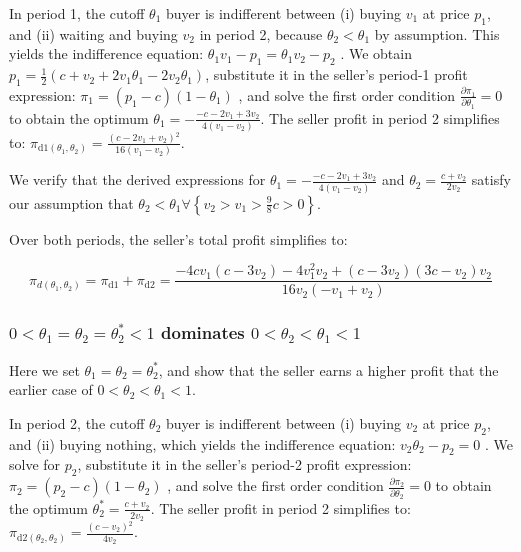 \documentclass{article}
\begin{document}
In period 1, the cutoff \(\theta _1\) buyer is indifferent between (i) buying \(v_1\) at price \(p_1\), and (ii) waiting and buying \(v_2\) in period
2, because \(\theta _2<\theta _1\) by assumption. This { }yields the indifference equation: \(\theta _1v_1 - p_1 = \theta _1 v_2 - p_2\) . We obtain
\(p_1=\frac{1}{2} \left(c+v_2+2 v_1 \theta _1-2 v_2 \theta _1\right)\), substitute it in the seller{'}s period-1 profit expression: \(\pi _1=\left(p_1-c\right)\left(1-\theta
_1\right)\) , and solve the first order condition \(\frac{\partial \pi _1}{\partial \theta _1}=0\) to obtain the optimum \(\theta _1=-\frac{-c-2
v_1+3 v_2}{4 \left(v_1-v_2\right)}\). The seller profit in period 2 simplifies to: \(\pi _{\text{d1}\left(\theta _1,\theta _2\right)}=\frac{\left(c-2
v_1+v_2\right){}^2}{16 \left(v_1-v_2\right)}\).

We verify that the derived expressions for \(\theta _1=-\frac{-c-2 v_1+3 v_2}{4 \left(v_1-v_2\right)}\) and \(\theta _2=\frac{c+v_2}{2 v_2}\) satisfy
our assumption that \(\theta _2<\theta _1\forall \left\{v_2>v_1>\frac{9}{8}c>0\right\}\).

Over both periods, the seller{'}s total profit simplifies to: 

\begin{equation}
\pi _{d\left(\theta _1,\theta _2\right)}=\pi _{\text{d1}}+\pi _{\text{d2}}=\frac{-4 c v_1 \left(c-3 v_2\right)-4 v_1^2 v_2+\left(c-3 v_2\right) \left(3
c-v_2\right) v_2}{16 v_2 \left(-v_1+v_2\right)}
\end{equation}

\subsubsection*{\(0<\theta _1=\theta _2=\theta _2^*<1\) dominates \(0<\theta _2<\theta _1<1\) }

Here we set \(\theta _1=\theta _2=\theta _2^*\), and show that the seller earns a higher profit that the earlier case of \(0<\theta _2<\theta _1<1\).

In period 2, the cutoff \(\theta _2\) buyer is indifferent between (i) buying \(v_2\) at price \(p_2\), and (ii) buying nothing, which yields the
indifference equation: \(v_2 \theta _2-p_2 = 0\) . We solve for \(p_2\), substitute it in the seller{'}s period-2 profit expression: \(\pi _2=\left(p_2-c\right)\left(1-\theta
_2\right)\) , and solve the first order condition \(\frac{\partial \pi _2}{\partial \theta _2}=0\) to obtain the optimum \(\theta _2^*=\frac{c+v_2}{2
v_2}\). The seller profit in period 2 simplifies to: \(\pi _{\text{d2}\left(\theta _2,\theta _2\right)}=\frac{\left(c-v_2\right){}^2}{4 v_2}\).
\end{document}
